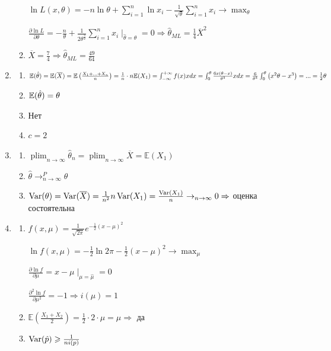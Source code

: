 \documentclass[12pt, a4paper]{article}\usepackage[]{graphicx}\usepackage[]{color}
\DeclareMathOperator*\plim{plim}
\begin{document}
\begin{enumerate}
\begin{enumerate}
								$\ln L(x, \theta) = -n \ln \theta + \sum_{i=1}^n \ln x_i - \frac{1}{\sqrt{\theta}} \sum_{i=1}^n x_i \to \max_\theta $

								$\frac{\partial \ln L}{\partial \theta} = -\frac{n}{\theta} + \frac{1}{2\theta^{\frac{3}{2}}} \sum_{i=1}^{n} x_i \mid_{\hat{\theta} = \theta} =0 \Rightarrow \hat{\theta}_{ML} = \frac{1}{4} \overline{X}^2$

								\item $\overline{X} = \frac{7}{4} \Rightarrow \hat{\theta}_{ML} = \frac{49}{64}$
							\end{enumerate}

							\item
							\begin{enumerate}
								\item $\mathbb{E}(\hat{\theta}) = \mathbb{E}(\overline{X}) = \mathbb{E} \left(\frac{X_1+...+X_n}{n} \right) = \frac{1}{n} \cdot n \mathbb{E}(X_1) = \int_{-\infty}^{+\infty} f(x)x dx = \int_{0}^{\theta} \frac{6x(\theta-x)}{\theta^3} x dx = \frac{6}{\theta^3} \int_{0}^{\theta} \left( x^2\theta - x^3\right) = ... = \frac{1}{2} \theta$
					\item $\mathbb{E}(\hat{\theta}) = \theta$
				\item Нет
				\item $c=2$
			\end{enumerate}

			\item
			\begin{enumerate}
				\item $\plim_{n\to\infty} \hat{\theta}_n = \plim_{n\to\infty} \overline{X} = \mathbb{E}(X_1)$
				\item $\hat{\theta} \to^P_{n\to\infty} \theta$
				\item $\operatorname{Var}(\theta) = \operatorname{Var}(\overline{X}) = \frac{1}{n^2}n\operatorname{Var}(X_1) = \frac{\operatorname{Var}(X_1)}{n} \to_{n\to\infty} 0 \Rightarrow$ оценка состоятельна
			\end{enumerate}

			\item
			\begin{enumerate}
				\item $f(x, \mu) =  \frac{1}{\sqrt{2 \pi}} e^{-\frac{1}{2} (x - \mu)^2}$

				$\ln f(x, \mu) = -\frac{1}{2} \ln 2\pi -\frac{1}{2}(x - \mu)^2 \to \max_\mu$

				$\frac{\partial \ln f}{\partial \mu} = x - \mu \mid_{\mu=\hat{\mu}} =0 $

				$\frac{\partial^2 \ln f}{\partial \mu^2} = -1 \Rightarrow i(\mu) = 1$
				\item $\mathbb{E}\left(\frac{X_1 + X_2}{2} \right) = \frac{1}{2} \cdot 2 \cdot  \mu = \mu \Rightarrow$ да
				\item $\operatorname{Var}(\hat{p}) \geqslant \frac{1}{ni(p)}$
			\end{enumerate}


\end{enumerate}
\end{document}
